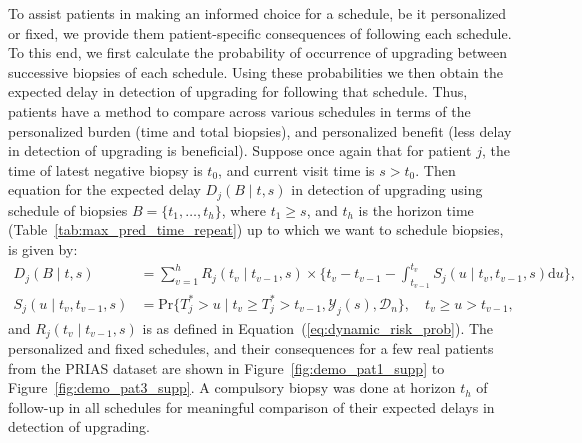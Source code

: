 To assist patients in making an informed choice for a schedule, be it personalized or fixed, we provide them patient-specific consequences of following each schedule. To this end, we first calculate the probability of occurrence of upgrading between successive biopsies of each schedule. Using these probabilities we then obtain the expected delay in detection of upgrading for following that schedule. Thus, patients have a method to compare across various schedules in terms of the personalized burden (time and total biopsies), and personalized benefit (less delay in detection of upgrading is beneficial). Suppose once again that for patient $j$, the time of latest negative biopsy is $t_0$, and current visit time is $s > t_0$. Then equation for the expected delay $D_j(B \mid t,s)$ in detection of upgrading using schedule of biopsies $B = \{t_1, \ldots, t_h\}$, where $t_1 \geq s$, and $t_h$ is the horizon time (Table~\ref{tab:max_pred_time_repeat}) up to which we want to schedule biopsies, is given by:
\begin{equation}
\label{eq:expected_delay}
\begin{split}
D_j(B \mid t,s) &= \sum_{v=1}^{h} R_j(t_v\mid t_{v-1},s) \times  \Big\{t_{v} - t_{v-1} - \int_{t_{v-1}}^{t_v} S_j(u \mid t_v, t_{v-1}, s) \mathrm{d}u \Big\},\\
S_j(u \mid t_v, t_{v-1}, s) &= \mbox{Pr}\big\{T^*_j > u \mid t_{v} \geq T^*_j > t_{v-1}, \mathcal{Y}_{j}(s), \mathcal{D}_n\big\}, \quad t_{v} \geq u > t_{v-1},
\end{split}
\end{equation}
and $R_j(t_v\mid t_{v-1},s)$ is as defined in Equation~(\ref{eq:dynamic_risk_prob}). The personalized and fixed schedules, and their consequences for a few real patients from the PRIAS dataset are shown in Figure~\ref{fig:demo_pat1_supp} to Figure~\ref{fig:demo_pat3_supp}. A compulsory biopsy was done at horizon $t_h$ of follow-up in all schedules for meaningful comparison of their expected delays in detection of upgrading.

